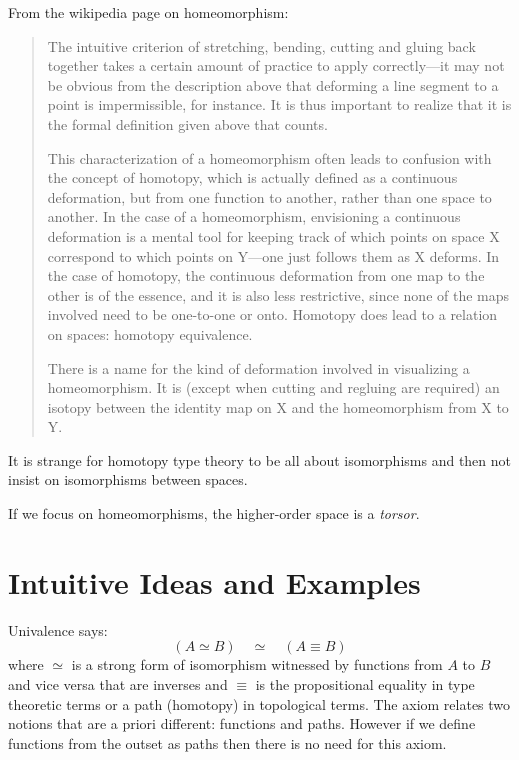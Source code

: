 \documentclass[11pt]{article}
\begin{document}
From the wikipedia page on homeomorphism: 
\begin{quote}
The intuitive criterion of stretching, bending, cutting and gluing back
together takes a certain amount of practice to apply correctly—it may not be
obvious from the description above that deforming a line segment to a point
is impermissible, for instance. It is thus important to realize that it is
the formal definition given above that counts.

This characterization of a homeomorphism often leads to confusion with the
concept of homotopy, which is actually defined as a continuous deformation,
but from one function to another, rather than one space to another. In the
case of a homeomorphism, envisioning a continuous deformation is a mental
tool for keeping track of which points on space X correspond to which points
on Y—one just follows them as X deforms. In the case of homotopy, the
continuous deformation from one map to the other is of the essence, and it is
also less restrictive, since none of the maps involved need to be one-to-one
or onto. Homotopy does lead to a relation on spaces: homotopy equivalence.

There is a name for the kind of deformation involved in visualizing a
homeomorphism. It is (except when cutting and regluing are required) an
isotopy between the identity map on X and the homeomorphism from X to Y.
\end{quote}

It is strange for homotopy type theory to be all about isomorphisms and then
not insist on isomorphisms between spaces.

If we focus on homeomorphisms, the higher-order space is a \emph{torsor}.

\section{Intuitive Ideas and Examples} 
\label{sec:intuition}


Univalence says:
\[ 
(A \simeq B) \quad\simeq\quad (A \equiv B)
\]
where $\simeq$ is a strong form of isomorphism witnessed by functions from
$A$ to $B$ and vice versa that are inverses and $\equiv$ is the propositional
equality in type theoretic terms or a path (homotopy) in topological
terms. The axiom relates two notions that are a priori different: functions
and paths. However if we define functions from the outset as paths then there
is no need for this axiom.
\end{document}
